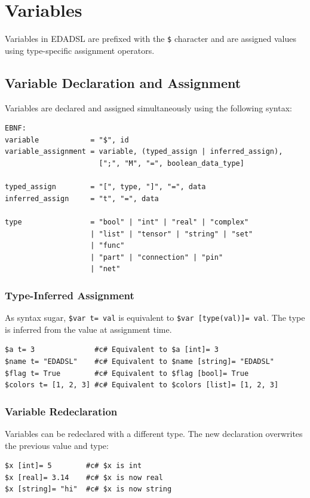 \chapter{Variables}
Variables in EDADSL are prefixed with the \texttt{\$} character and are assigned values using type-specific assignment operators.

\section{Variable Declaration and Assignment}
Variables are declared and assigned simultaneously using the following syntax:
\begin{verbatim}
EBNF:
variable            = "$", id
variable_assignment = variable, (typed_assign | inferred_assign),
                      [";", "M", "=", boolean_data_type]

typed_assign        = "[", type, "]", "=", data
inferred_assign     = "t", "=", data

type                = "bool" | "int" | "real" | "complex" 
                    | "list" | "tensor" | "string" | "set" 
                    | "func"
                    | "part" | "connection" | "pin" 
                    | "net"
\end{verbatim}

\subsection{Type-Inferred Assignment}
As syntax sugar, \texttt{\$var t= val} is equivalent to \texttt{\$var [type(val)]= val}. The type is inferred from the value at assignment time.
\begin{verbatim}
$a t= 3              #c# Equivalent to $a [int]= 3
$name t= "EDADSL"    #c# Equivalent to $name [string]= "EDADSL"
$flag t= True        #c# Equivalent to $flag [bool]= True
$colors t= [1, 2, 3] #c# Equivalent to $colors [list]= [1, 2, 3]
\end{verbatim}

\subsection{Variable Redeclaration}
Variables can be redeclared with a different type. The new declaration overwrites the previous value and type:
\begin{verbatim}
$x [int]= 5        #c# $x is int
$x [real]= 3.14    #c# $x is now real
$x [string]= "hi"  #c# $x is now string
\end{verbatim}

